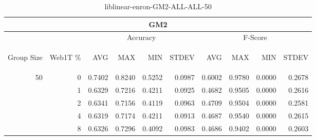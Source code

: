 \begin{center}
\begin{table}[htbp]
\begin{tabular}{ | r | r | r | r | r | r | r | r | r | r |}
\hline
\multicolumn{10}{|c|}{GM2}\\
\hline
 & & \multicolumn{4}{|c|}{Accuracy} & \multicolumn{4}{|c|}{F-Score}\\ \cline{3-10}
\begin{sideways}Group Size\end{sideways} & \begin{sideways}Web1T \%\end{sideways} & \begin{sideways}AVG\end{sideways} & \begin{sideways}MAX\end{sideways} & \begin{sideways}MIN\end{sideways} & \begin{sideways}STDEV\end{sideways} & \begin{sideways}AVG\end{sideways} & \begin{sideways}MAX\end{sideways} & \begin{sideways}MIN\end{sideways} & \begin{sideways}STDEV\end{sideways}\\
\hline
\multirow{5}{*}{50}
 & 0 & 0.7402 & 0.8240 & 0.5252 & 0.0987 & 0.6002 & 0.9780 & 0.0000 & 0.2678\\ \cline{2-10}
 & 1 & 0.6329 & 0.7216 & 0.4211 & 0.0925 & 0.4682 & 0.9505 & 0.0000 & 0.2616\\ \cline{2-10}
 & 2 & 0.6341 & 0.7156 & 0.4119 & 0.0963 & 0.4709 & 0.9504 & 0.0000 & 0.2581\\ \cline{2-10}
 & 4 & 0.6319 & 0.7174 & 0.4211 & 0.0913 & 0.4687 & 0.9540 & 0.0000 & 0.2615\\ \cline{2-10}
 & 8 & 0.6326 & 0.7296 & 0.4092 & 0.0983 & 0.4686 & 0.9402 & 0.0000 & 0.2603\\ \cline{2-10}
\hline
\end{tabular}
\caption{liblinear-enron-GM2-ALL-ALL-50}
\end{table}
\end{center}

